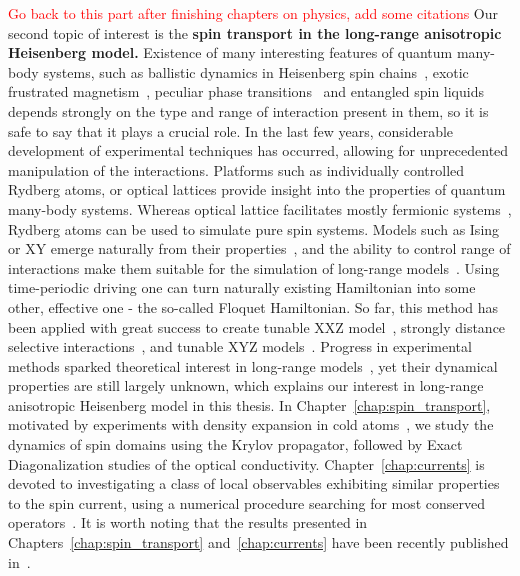 \textcolor{red}{Go back to this part after finishing chapters on physics, add some citations}
Our second topic of interest is the \textbf{spin transport in the long-range anisotropic Heisenberg model.}
Existence of many interesting features of quantum many-body systems, such as ballistic dynamics in Heisenberg spin
chains~\autocite{Zotos1997,Bertini2021},
exotic frustrated magnetism~\autocite{Nisoli2017}, peculiar phase transitions~\autocite{Sandvik2010b,Yang2021}
and entangled spin liquids~\autocite{Balents2010} depends strongly
on the type and range of interaction present in them, so it is safe to say that it plays a crucial role.
In the last few years, considerable development of experimental techniques has
occurred, allowing for unprecedented manipulation of the interactions.
Platforms such as individually controlled Rydberg atoms, or optical lattices provide insight into the
properties of quantum many-body systems. Whereas optical lattice facilitates mostly fermionic
systems~\autocite{Bakr2009, Greif2016, Parsons2015, Boll2016}, Rydberg atoms can be used to simulate pure spin systems.
Models such as Ising or XY emerge naturally from their properties~\autocite{Browaeys2020}, and the ability to control
range of interactions make them suitable for the simulation of long-range models~\autocite{Borish2020}. Using time-periodic
driving one can turn naturally existing Hamiltonian into some other, effective one - the so-called Floquet Hamiltonian.
So far, this method has been applied with great success to create tunable XXZ model~\autocite{Scholl2022}, strongly distance
selective interactions~\autocite{Hollerith2022}, and tunable XYZ models~\autocite{Steinert2022, Geier2021}.
Progress in experimental methods sparked theoretical interest in long-range
models~\autocite{Richerme2014,Jurcevic2014,Hauke2013,FossFeig2015,Maghrebi2016,Lepori2017,Frerot2017,Vanderstraeten2018,Cevolani2018,Kloss2019,Ren2020,Bulchandani2022a},
yet their dynamical properties are still largely unknown, which explains our interest in long-range anisotropic
Heisenberg model in this thesis.
In Chapter~\ref{chap:spin_transport}, motivated by experiments with density expansion in cold atoms~\autocite{Ronzheimer2013,Vidmar2013,Neyenhuis2017},
we study the dynamics of spin domains using the Krylov propagator, followed by Exact Diagonalization studies of the optical conductivity.
Chapter~\ref{chap:currents} is devoted to investigating a class of local observables exhibiting similar properties
to the spin current, using a numerical procedure searching for most conserved operators~\autocite{Mierzejewski2015a}.
It is worth noting that the results presented in Chapters~\ref{chap:spin_transport} and~\ref{chap:currents} have
been recently published in~\textcite{Mierzejewski2023}.

